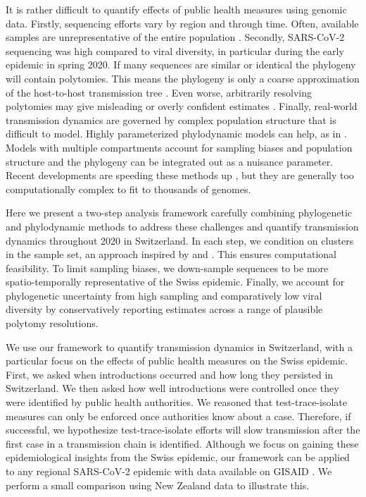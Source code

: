 \documentclass[11pt,twoside,lineno]{pnas-new} %
\begin{document}
It is rather difficult to quantify effects of public health measures using genomic data. Firstly, sequencing efforts vary by region and through time. Often, available samples are unrepresentative of the entire population \cite{Villabona-Arenas2020, DeMaio2015}. Secondly, SARS-CoV-2 sequencing was high compared to viral diversity, in particular during the early epidemic in spring 2020. If many sequences are similar or identical the phylogeny will contain polytomies. This means the phylogeny is only a coarse approximation of the  host-to-host transmission tree \cite{Villabona-Arenas2020}. Even worse, arbitrarily resolving polytomies may give misleading or overly confident estimates \cite{Morel2021}. Finally, real-world transmission dynamics are governed by complex population structure that is difficult to model. Highly parameterized phylodynamic models can help, as in \cite{Miller2020, Geoghegan2020a, Muller2020a}. Models with multiple compartments account for sampling biases and population structure and the phylogeny can be integrated out as a nuisance parameter. Recent developments are speeding these methods up \cite{Lemey2021}, but they are generally too computationally complex to fit to thousands of genomes.

Here we present a two-step analysis framework carefully combining phylogenetic and phylodynamic methods to address these challenges and quantify transmission dynamics throughout 2020 in Switzerland. In each step, we condition on clusters in the sample set, an approach inspired by  \cite{Muller2020} and \cite{DuPlessis2021}. This ensures computational feasibility. To limit sampling biases, we down-sample sequences to be more spatio-temporally representative of the Swiss epidemic. Finally, we account for phylogenetic uncertainty from high sampling and comparatively low viral diversity by conservatively reporting estimates across a range of plausible polytomy resolutions.

We use our framework to quantify transmission dynamics in Switzerland, with a particular focus on the effects of public health measures on the Swiss epidemic. First, we asked when introductions occurred and how long they persisted in Switzerland. We then asked how well introductions were controlled once they were identified by public health authorities. We reasoned that test-trace-isolate measures can only be enforced once authorities know about a case. Therefore, if successful, we hypothesize test-trace-isolate efforts will slow transmission after the first case in a transmission chain is identified. Although we focus on gaining these epidemiological insights from the Swiss epidemic, our framework can be applied to any regional SARS-CoV-2 epidemic with data available on GISAID \cite{GISAID}. We perform a small comparison using New Zealand data to illustrate this. 
\end{document}
